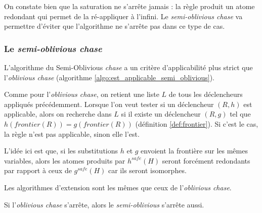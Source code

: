 On constate bien que la saturation ne s'arrête jamais : la règle produit un atome redondant qui permet de la ré-appliquer à l'infini. Le \textit{semi-oblivious chase} va permettre d'éviter que l'algorithme ne s'arrête pas dans ce type de cas.

\subsubsection{Le \textit{semi-oblivious chase}}\label{sec:semi_oblivious_chase}



L'algorithme du Semi-Oblivious \textit{chase} a un critère d'applicabilité plus strict que l'\textit{oblivious chase} (algorithme \ref{algo:est_applicable_semi_oblivious}). 
\par Comme pour l'\textit{oblivious chase}, on retient une liste $L$ de tous les déclencheurs appliqués précédemment. Lorsque l'on veut tester si un déclencheur $(R,h)$ est applicable, alors on recherche dans $L$ si il existe un déclencheur $(R,g)$ tel que $h(frontier(R)) = g(frontier(R))$ (définition \ref{def:frontier}). Si c'est le cas, la règle n'est pas applicable, sinon elle l'est.
\par L'idée ici est que, si les substitutions $h$ et $g$ envoient la frontière sur les mêmes variables, alors les atomes produits par $h^{safe}(H)$ seront forcément redondants par rapport à ceux de $g^{safe}(H)$ car ils seront isomorphes.
\par Les algorithmes d'extension sont les mêmes que ceux de l'\textit{oblivious chase}.

\begin{proposition}
    Si l'\textit{oblivious chase} s'arrête, alors le \textit{semi-oblivious} s'arrête aussi.
\end{proposition}

